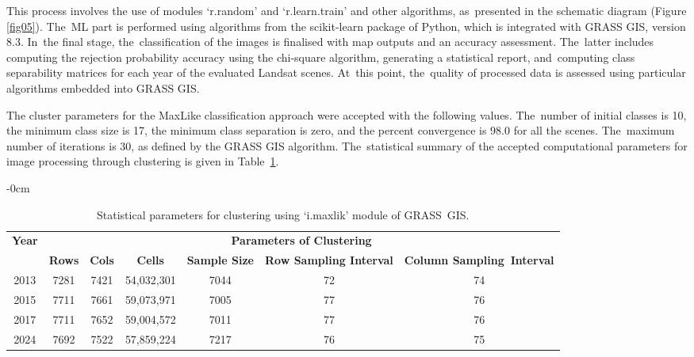 \documentclass[jmse,article,accept,pdftex,oneauthor]{Definitions/mdpi}
\begin{document}
{This process involves the use of modules `r.random' and `r.learn.train' and other algorithms, as~presented in the schematic diagram (Figure} \ref{fig05}{). The~ML part is performed using algorithms from the scikit-learn package of Python, which is integrated with GRASS GIS, version 8.3. In~the final stage, the~classification of the images is finalised with map outputs and an accuracy assessment. The~latter includes computing the rejection probability accuracy using the chi-square algorithm, generating a statistical report, and~computing class separability matrices for each year of the evaluated Landsat scenes. At~this point, the~quality of processed data is assessed using particular algorithms embedded into GRASS GIS.}

The cluster parameters for the MaxLike classification approach were accepted {with the }following {values}. The~number of initial classes is 10, the minimum class size is 17, the minimum class separation is zero, and the percent convergence is 98.0 for all the scenes. The~maximum number of iterations is 30, as defined by the GRASS GIS algorithm. The~statistical summary of the accepted computational parameters for image processing through clustering is given in Table~\ref{tab02}.

\begin{table}[H]
  \caption{Statistical parameters for clustering using `i.maxlik' module of GRASS~GIS.   \label{tab02}}
\setlength{\tabcolsep}{3.17mm}
\begin{adjustwidth}{-\extralength}{0cm}
  \begin{tabular}{ccccccc}
  \toprule
  \multirow{2}{*}{\textbf{Year}} & \multicolumn{6}{c}{\textbf{Parameters of Clustering}} \\
     & \textbf{Rows} & \textbf{Cols} & \textbf{Cells} & \textbf{Sample Size} & \textbf{Row Sampling Interval} & \textbf{Column Sampling~Interval} \\
    \midrule
    2013 %
    & 7281 & 7421 & 54,032,301 & 7044 & 72 & 74 \\
    2015 & 7711 & 7661 & 59,073,971 & 7005 & 77 & 76 \\
    2017 & 7711 & 7652 & 59,004,572 & 7011 & 77 & 76 \\
    2024 & 7692 & 7522 & 57,859,224 & 7217 & 76 & 75 \\
\bottomrule

\end{tabular}
\end{adjustwidth}

\end{table}
\end{document}
